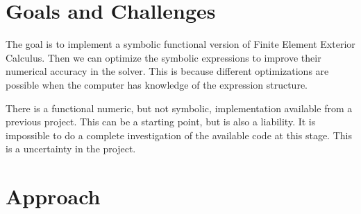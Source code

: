 \documentclass{scrartcl}
\begin{document}




\section{Goals and Challenges}

The goal is to implement a symbolic functional version of Finite
Element Exterior Calculus.  Then we can optimize the symbolic expressions to
improve their numerical accuracy in the solver. This is because
different optimizations are possible when the computer has knowledge
of the expression structure.



There is a functional numeric, but not symbolic, implementation
available from a previous project. This can be a starting point, but
is also a liability.  It is impossible to do a complete investigation
of the available code at this stage.  This is a uncertainty in the
project.


\section{Approach}

\end{document}
